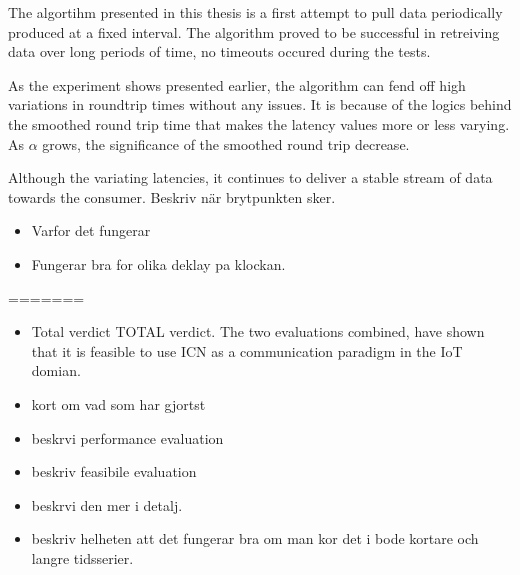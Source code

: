 The algortihm presented in this thesis is a first attempt to pull data periodically produced at a fixed interval. The algorithm proved to be successful in retreiving data over long periods of time, no timeouts occured during the tests. %

As the experiment shows presented earlier, the algorithm can fend off high variations in roundtrip times without any issues. It is because of the logics behind the smoothed round trip time that makes the latency values more or less varying. As $\alpha$ grows, the significance of the smoothed round trip decrease. 

Although the variating latencies, it continues to deliver a stable stream of data towards the consumer. 
Beskriv när brytpunkten sker.







\begin{itemize}
\item Varfor det fungerar
\item Fungerar bra for olika deklay pa klockan.
\end{itemize}
=======
\begin{itemize}
\item Total verdict
TOTAL verdict.
The two evaluations combined, have shown that it is feasible to use ICN as a communication paradigm in the IoT domian. 
\end{itemize}

\begin{itemize}
\item kort om vad som har gjortst
\item beskrvi performance evaluation
\item beskriv feasibile evaluation
\item beskrvi den mer i detalj.
\item beskriv helheten att det fungerar bra om man kor det i bode kortare och langre tidsserier.
\end{itemize}
\newpage


